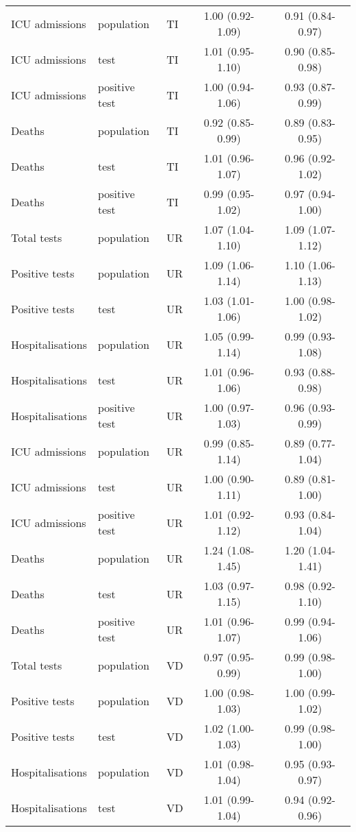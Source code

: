 \documentclass{article}
\begin{document}
\begin{longtable}{lllcc}
		ICU admissions & population & TI & 1.00 (0.92-1.09) & 0.91 (0.84-0.97) \\ 
		ICU admissions & test & TI & 1.01 (0.95-1.10) & 0.90 (0.85-0.98) \\ 
		ICU admissions & positive test & TI & 1.00 (0.94-1.06) & 0.93 (0.87-0.99) \\ 
		Deaths & population & TI & 0.92 (0.85-0.99) & 0.89 (0.83-0.95) \\ 
		Deaths & test & TI & 1.01 (0.96-1.07) & 0.96 (0.92-1.02) \\ 
		Deaths & positive test & TI & 0.99 (0.95-1.02) & 0.97 (0.94-1.00) \\ 
		Total tests & population & UR & 1.07 (1.04-1.10) & 1.09 (1.07-1.12) \\ 
		Positive tests & population & UR & 1.09 (1.06-1.14) & 1.10 (1.06-1.13) \\ 
		Positive tests & test & UR & 1.03 (1.01-1.06) & 1.00 (0.98-1.02) \\ 
		Hospitalisations & population & UR & 1.05 (0.99-1.14) & 0.99 (0.93-1.08) \\ 
		Hospitalisations & test & UR & 1.01 (0.96-1.06) & 0.93 (0.88-0.98) \\ 
		Hospitalisations & positive test & UR & 1.00 (0.97-1.03) & 0.96 (0.93-0.99) \\ 
		ICU admissions & population & UR & 0.99 (0.85-1.14) & 0.89 (0.77-1.04) \\ 
		ICU admissions & test & UR & 1.00 (0.90-1.11) & 0.89 (0.81-1.00) \\ 
		ICU admissions & positive test & UR & 1.01 (0.92-1.12) & 0.93 (0.84-1.04) \\ 
		Deaths & population & UR & 1.24 (1.08-1.45) & 1.20 (1.04-1.41) \\ 
		Deaths & test & UR & 1.03 (0.97-1.15) & 0.98 (0.92-1.10) \\ 
		Deaths & positive test & UR & 1.01 (0.96-1.07) & 0.99 (0.94-1.06) \\ 
		Total tests & population & VD & 0.97 (0.95-0.99) & 0.99 (0.98-1.00) \\ 
		Positive tests & population & VD & 1.00 (0.98-1.03) & 1.00 (0.99-1.02) \\ 
		Positive tests & test & VD & 1.02 (1.00-1.03) & 0.99 (0.98-1.00) \\ 
		Hospitalisations & population & VD & 1.01 (0.98-1.04) & 0.95 (0.93-0.97) \\ 
		Hospitalisations & test & VD & 1.01 (0.99-1.04) & 0.94 (0.92-0.96) \\ 

\end{longtable}
\end{document}
